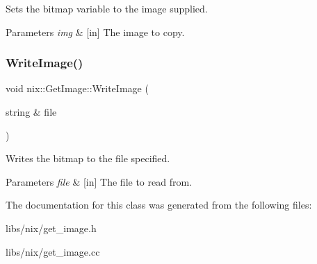 Sets the bitmap variable to the image supplied. 


\begin{DoxyParams}{Parameters}
{\em img} & \mbox{[}in\mbox{]} The image to copy. \\
\hline
\end{DoxyParams}
\mbox{\label{classnix_1_1GetImage_afcd6ae5e71996de60bd0b9204649e322}} 
\subsubsection{\texorpdfstring{Write\+Image()}{WriteImage()}}
{\footnotesize\ttfamily void nix\+::\+Get\+Image\+::\+Write\+Image (\begin{DoxyParamCaption}\item[{string \&}]{file }\end{DoxyParamCaption})}



Writes the bitmap to the file specified. 


\begin{DoxyParams}{Parameters}
{\em file} & \mbox{[}in\mbox{]} The file to read from. \\
\hline
\end{DoxyParams}


The documentation for this class was generated from the following files\+:\begin{DoxyCompactItemize}
\item 
libs/nix/get\+\_\+image.\+h\item 
libs/nix/get\+\_\+image.\+cc\end{DoxyCompactItemize}
